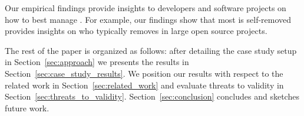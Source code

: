 Our empirical findings provide insights to developers and software projects on how to best manage \SATD. For example, our findings show that most \SATD is self-removed provides insights on who typically removes \SATD in large open source projects.

The rest of the paper is organized as follows: after detailing the case study setup in Section~\ref{sec:approach} we presents the results in Section~\ref{sec:case_study_results}. We position our results with respect to the related work in Section~\ref{sec:related_work} and evaluate threats to validity in Section~\ref{sec:threats_to_validity}.  Section~\ref{sec:conclusion} concludes and sketches future work.





